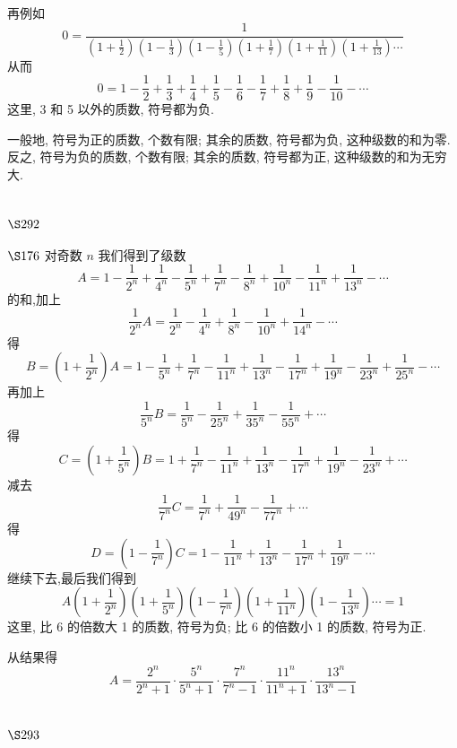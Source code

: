 再例如
\[
0=\frac{1}{\left(1+\frac{1}{2}\right)\left(1-\frac{1}{3}\right)\left(1-\frac{1}{5}\right)\left(1+\frac{1}{7}\right)\left(1+\frac{1}{11}\right)\left(1+\frac{1}{13}\right) \cdots}
\]
从而
\[
0=1-\frac{1}{2}+\frac{1}{3}+\frac{1}{4}+\frac{1}{5}-\frac{1}{6}-\frac{1}{7}+\frac{1}{8}+\frac{1}{9}-\frac{1}{10}-\cdots
\]
这里, 3 和 5 以外的质数, 符号都为负.

一般地, 符号为正的质数, 个数有限; 其余的质数, 符号都为负, 这种级数的和为零. 反之, 符号为负的质数, 个数有限; 其余的质数, 符号都为正, 这种级数的和为无穷大.

\section{$\S 292$}

$\S 176$ 对奇数 $n$ 我们得到了级数
\[
A=1-\frac{1}{2^{n}}+\frac{1}{4^{n}}-\frac{1}{5^{n}}+\frac{1}{7^{n}}-\frac{1}{8^{n}}+\frac{1}{10^{n}}-\frac{1}{11^{n}}+\frac{1}{13^{n}}-\cdots
\]
的和,加上
\[
\frac{1}{2^{n}} A=\frac{1}{2^{n}}-\frac{1}{4^{n}}+\frac{1}{8^{n}}-\frac{1}{10^{n}}+\frac{1}{14^{n}}-\cdots
\]
得
\[
B=\left(1+\frac{1}{2^{n}}\right) A=1-\frac{1}{5^{n}}+\frac{1}{7^{n}}-\frac{1}{11^{n}}+\frac{1}{13^{n}}-\frac{1}{17^{n}}+\frac{1}{19^{n}}-\frac{1}{23^{n}}+\frac{1}{25^{n}}-\cdots
\]
再加上
\[
\frac{1}{5^{n}} B=\frac{1}{5^{n}}-\frac{1}{25^{n}}+\frac{1}{35^{n}}-\frac{1}{55^{n}}+\cdots
\]
得
\[
C=\left(1+\frac{1}{5^{n}}\right) B=1+\frac{1}{7^{n}}-\frac{1}{11^{n}}+\frac{1}{13^{n}}-\frac{1}{17^{n}}+\frac{1}{19^{n}}-\frac{1}{23^{n}}+\cdots
\]
减去
\[
\frac{1}{7^{n}} C=\frac{1}{7^{n}}+\frac{1}{49^{n}}-\frac{1}{77^{n}}+\cdots
\]
得
\[
D=\left(1-\frac{1}{7^{n}}\right) C=1-\frac{1}{11^{n}}+\frac{1}{13^{n}}-\frac{1}{17^{n}}+\frac{1}{19^{n}}-\cdots
\]
继续下去,最后我们得到
\[
A\left(1+\frac{1}{2^{n}}\right)\left(1+\frac{1}{5^{n}}\right)\left(1-\frac{1}{7^{n}}\right)\left(1+\frac{1}{11^{n}}\right)\left(1-\frac{1}{13^{n}}\right) \cdots=1
\]
这里, 比 6 的倍数大 1 的质数, 符号为负; 比 6 的倍数小 1 的质数, 符号为正.

从结果得
\[
A=\frac{2^{n}}{2^{n}+1} \cdot \frac{5^{n}}{5^{n}+1} \cdot \frac{7^{n}}{7^{n}-1} \cdot \frac{11^{n}}{11^{n}+1} \cdot \frac{13^{n}}{13^{n}-1}
\]
\section{$\S 293$}

